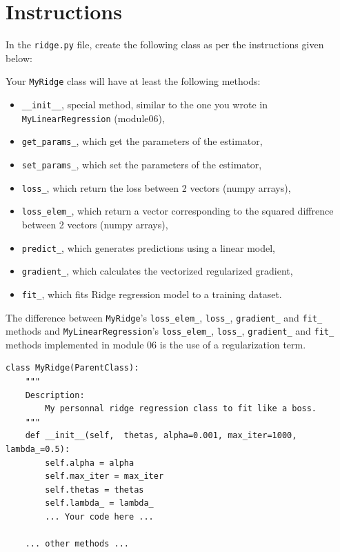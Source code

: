 \documentclass{42-en}
\begin{document}
\section*{Instructions}
In the \texttt{ridge.py} file, create the following class as per the instructions given below:

Your \texttt{MyRidge} class will have at least the following methods:
\begin{itemize}
  \item \texttt{\_\_init\_\_}, special method, similar to the one you wrote in \texttt{MyLinearRegression} (module06),
  \item \texttt{get\_params\_}, which get the parameters of the estimator, 
  \item \texttt{set\_params\_}, which set the parameters of the estimator,
  \item \texttt{loss\_}, which return the loss between 2 vectors (numpy arrays),
  \item \texttt{loss\_elem\_}, which return a vector corresponding to the squared diffrence between 2 vectors (numpy arrays),  
  \item \texttt{predict\_}, which generates predictions using a linear model,
  \item \texttt{gradient\_}, which calculates the vectorized regularized gradient,
  \item \texttt{fit\_}, which fits Ridge regression model to a training dataset.
\end{itemize}


The difference between \texttt{MyRidge}'s \texttt{loss\_elem\_}, \texttt{loss\_}, \texttt{gradient\_} and \texttt{fit\_} methods and \texttt{MyLinearRegression}'s \texttt{loss\_elem\_}, \texttt{loss\_}, \texttt{gradient\_} and \texttt{fit\_} methods implemented in module 06 is the use of a regularization term.

\begin{verbatim}
class MyRidge(ParentClass):
	"""
	Description:
		My personnal ridge regression class to fit like a boss.
	"""
	def __init__(self,  thetas, alpha=0.001, max_iter=1000, lambda_=0.5):
		self.alpha = alpha
		self.max_iter = max_iter
		self.thetas = thetas
		self.lambda_ = lambda_
		... Your code here ...

	... other methods ...
\end{verbatim}
\end{document}
